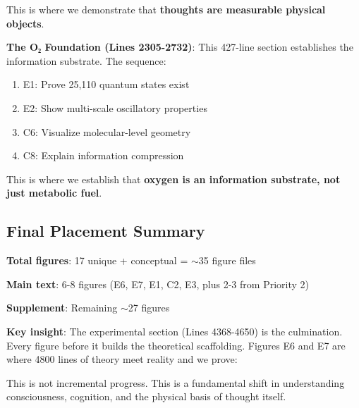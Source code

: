 \documentclass[11pt]{article}
\begin{document}
This is where we demonstrate that \textbf{thoughts are measurable physical objects}.

\textbf{The O₂ Foundation (Lines 2305-2732)}:
This 427-line section establishes the information substrate. The sequence:
\begin{enumerate}
\item E1: Prove 25,110 quantum states exist
\item E2: Show multi-scale oscillatory properties
\item C6: Visualize molecular-level geometry
\item C8: Explain information compression
\end{enumerate}

This is where we establish that \textbf{oxygen is an information substrate, not just metabolic fuel}.

\subsection{Final Placement Summary}

\textbf{Total figures}: 17 unique + conceptual = $\sim$35 figure files

\textbf{Main text}: 6-8 figures (E6, E7, E1, C2, E3, plus 2-3 from Priority 2)

\textbf{Supplement}: Remaining $\sim$27 figures

\textbf{Key insight}: The experimental section (Lines 4368-4650) is the culmination. Every figure before it builds the theoretical scaffolding. Figures E6 and E7 are where 4800 lines of theory meet reality and we prove:

\begin{center}
\end{center}

This is not incremental progress. This is a fundamental shift in understanding consciousness, cognition, and the physical basis of thought itself.
\end{document}

